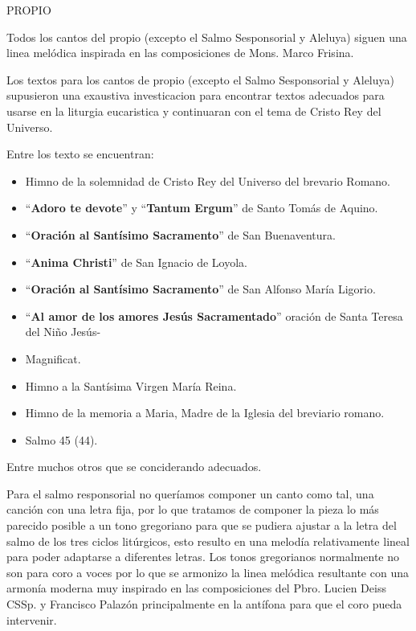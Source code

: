 \documentclass[12pt, letterpaper]{report}
\begin{document}
    {\large PROPIO}

    Todos los cantos del propio (excepto el Salmo Sesponsorial y Aleluya) siguen una linea mel\'odica inspirada en las composiciones de Mons. Marco Frisina.

    Los textos para los cantos de propio (excepto el Salmo Sesponsorial y Aleluya) supusieron una exaustiva investicacion para encontrar textos adecuados para usarse en la liturgia eucaristica y continuaran con el tema de Cristo Rey del Universo.

    Entre los texto se encuentran:

    \begin{itemize}
      \item Himno de la solemnidad de Cristo Rey del Universo del brevario Romano.
      \item ``\textbf{Adoro te devote}'' y ``\textbf{Tantum Ergum}'' de Santo Tom\'as de Aquino.
      \item ``\textbf{Oraci\'on al Sant\'isimo Sacramento}'' de San Buenaventura.
      \item ``\textbf{Anima Christi}'' de San Ignacio de Loyola.
      \item ``\textbf{Oraci\'on al Sant\'isimo Sacramento}'' de San Alfonso Mar\'ia Ligorio.
      \item ``\textbf{Al amor de los amores Jes\'us Sacramentado}'' oraci\'on de Santa Teresa del Ni\~no Jes\'us-
      \item Magnificat.
      \item Himno a la Sant\'isima Virgen Mar\'ia Reina.
      \item Himno de la memoria a Maria, Madre de la Iglesia del breviario romano.
      \item Salmo 45 (44).
    \end{itemize}

    Entre muchos otros que se conciderando adecuados.

    Para el salmo responsorial no quer\'iamos componer un canto como tal, una canci\'on con una letra fija, por lo que tratamos de componer la pieza lo m\'as parecido posible a un tono gregoriano para que se pudiera ajustar a la letra del salmo de
    los tres ciclos lit\'urgicos, esto resulto en una melod\'ia relativamente lineal para poder adaptarse a diferentes letras. Los tonos gregorianos normalmente no son para coro a voces por lo que se armonizo la linea mel\'odica resultante con una armon\'ia moderna muy inspirado en las composiciones del Pbro. Lucien Deiss CSSp. y Francisco Palaz\'on principalmente en la ant\'ifona para que el coro pueda intervenir.
\end{document}

